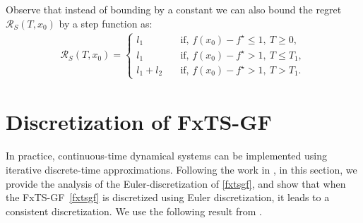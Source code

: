 \documentclass[letterpaper]{article}
\begin{document}
Observe that instead of bounding by a constant we can also bound the regret $\mathcal{R}_S(T,x_0)$ by a step function as: 
\begin{align*}
\mathcal{R}_S(T,x_0)= \begin{cases} 
l_1 \quad &\text{if, } f(x_0)-f^\star \leq1, \: T\geq 0,\\ 
l_1 \quad &\text{if, } f(x_0)-f^\star >1, \: T\leq T_1,\\
l_1+l_2 \quad &\text{if, } f(x_0)-f^\star >1, \: T> T_1.
\end{cases}
\end{align*}


\section{Discretization of FxTS-GF} \label{sec: discretization} 
In practice, continuous-time dynamical systems can be implemented using iterative discrete-time approximations.
Following the work in \cite{garg2021MVIP,benosman2020optimizing}, 
in this section, we provide the analysis of the Euler-discretization of \eqref{fxtsgf}, and show that when the FxTS-GF~\eqref{fxtsgf} is discretized using Euler discretization, it leads to a consistent discretization. We use the following result from \cite{garg2021MVIP}.
\end{document}
